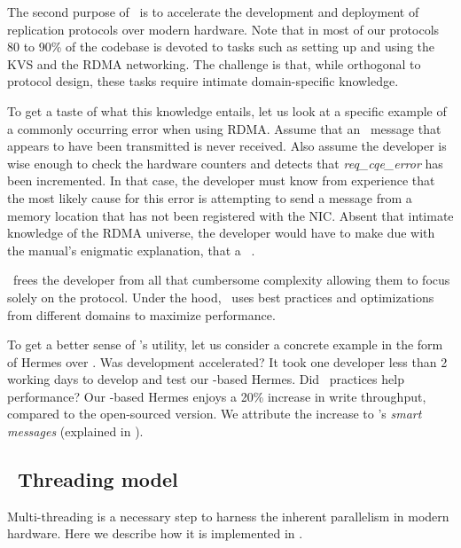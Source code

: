 The second purpose of \odlib\ is to accelerate the development and deployment of replication protocols over modern hardware.
Note that in most of our protocols 80 to 90\% of the codebase is devoted to tasks such as %
setting up and using the KVS and the RDMA networking.
The challenge is that, while orthogonal to protocol design, these tasks 
require intimate domain-specific knowledge.

To get a taste of what this knowledge entails, let us look at a specific example of a commonly occurring error when using RDMA.
Assume that an \RDMA~message that appears to have been transmitted is never received.
Also assume 
the developer is wise enough to check the hardware counters and detects that \emph{req\_cqe\_error} has been incremented.
In that case, the developer must know from experience that the most likely cause for this error is attempting to send a message from a memory location that has not been registered with the NIC. Absent that intimate knowledge of the RDMA universe, the developer would have to make due
with the manual's enigmatic explanation, that a ~\cite{Mellanox:2020}.

\odlib\ frees the developer from all that cumbersome complexity allowing them to focus solely on the protocol. Under the hood, \odlib\ uses best practices and optimizations from different domains
to maximize performance.

To get a better sense of \odlib's utility, let us consider a concrete example in the form of 
Hermes over \odlib.  Was development accelerated? It took one developer less than 2 working days to develop and test our \odlib-based Hermes. Did \odlib\ practices help performance?
Our \odlib-based Hermes enjoys a 20\% increase in write throughput, compared to the open-sourced version. We attribute the increase to \odlib's \emph{smart messages} (explained in ).











\subsection{\odlib~Threading model}\label{sec:ex-mod}


Multi-threading is a necessary step to harness the inherent parallelism in modern hardware. Here we describe how it is implemented in \odlib.

